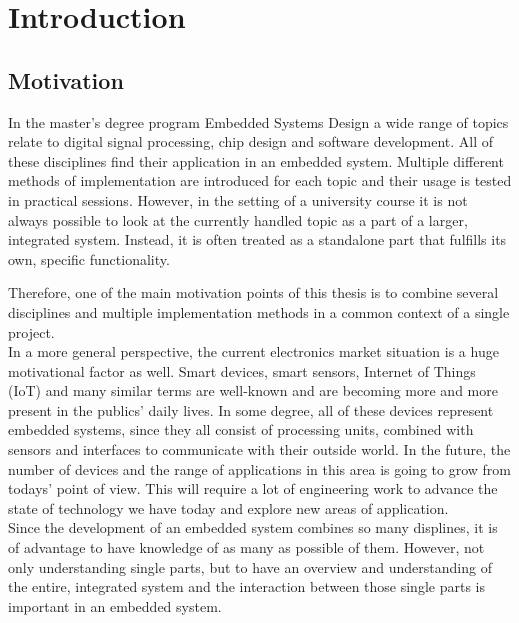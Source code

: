 \chapter{Introduction}
\label{cha:Introduction}

\section{Motivation}

In the master's degree program Embedded Systems Design a wide range of topics relate to digital signal processing, chip design and software development.
All of these disciplines find their application in an embedded system.
Multiple different methods of implementation are introduced for each topic and their usage is tested in practical sessions.
However, in the setting of a university course it is not always possible to look at the currently handled topic as a part of a larger, integrated system.
Instead, it is often treated as a standalone part that fulfills its own, specific functionality.

Therefore, one of the main motivation points of this thesis is to combine several disciplines and multiple implementation methods in a common context of a single project.\\

In a more general perspective, the current electronics market situation is a huge motivational factor as well.
Smart devices, smart sensors, Internet of Things (IoT) and many similar terms are well-known and are becoming more and more present in the publics' daily lives.
In some degree, all of these devices represent embedded systems, since they all consist of processing units, combined with sensors and interfaces to communicate with their outside world.
In the future, the number of devices and the range of applications in this area is going to grow from todays' point of view.
This will require a lot of engineering work to advance the state of technology we have today and explore new areas of application.\\

Since the development of an embedded system combines so many displines, it is of advantage to have knowledge of as many as possible of them.
However, not only understanding single parts, but to have an overview and understanding of the entire, integrated system and the interaction between those single parts is important in an embedded system.\\

